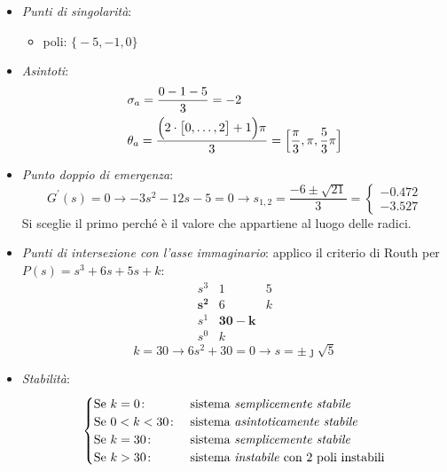 \begin{esercizio}
\begin{itemize}
	\item \emph{Punti di singolarità}:
		\begin{itemize}
			\item poli: \(\bigl\{ -5, -1, 0 \bigr\}\)
		\end{itemize}
	\item \emph{Asintoti}:
		\begin{align*}
			& \sigma_a = \frac{0-1-5}{3} = -2 \\
			& \theta_a = \frac{\Bigl( 2 \cdot \bigl[ 0, \dots, 2 \bigr] +1 \Bigr) \pi}{3} = \Bigl[ \frac{\pi}{3}, \pi, \frac{5}{3}\pi \Bigr]
		\end{align*}
	\item \emph{Punto doppio di emergenza}:
		\[
			G^\prime (s) = 0 \rightarrow -3s^2 -12s -5=0 \rightarrow s_{1,2} = \frac{-6\pm\sqrt{21}}{3} = \begin{cases} \bm{-0.472} \\ -3.527 \end{cases}
		\]
		Si sceglie il primo perché è il valore che appartiene al luogo delle radici.
	\item \emph{Punti di intersezione con l'asse immaginario}:
		applico il criterio di Routh per \(P(s) = s^3 +6s +5s +k\):
		\[\begin{array}{r|rr}
			s^3      & 1 & 5 \\
			\bm{s^2} & 6 & k \\
			s^1      & \bm{30-k} \\
			s^0      & k
		\end{array}\]
		\[
			k = 30 \rightarrow 6s^2+30 = 0 \rightarrow s = \pm \jmath \sqrt{5}
		\]
	\item \emph{Stabilità}:
		\[\begin{cases}
			\text{Se } k = 0\colon & \text{sistema \emph{semplicemente stabile}} \\
			\text{Se } 0 < k < 30\colon & \text{sistema \emph{asintoticamente stabile}} \\
			\text{Se } k = 30\colon & \text{sistema \emph{semplicemente stabile}} \\
			\text{Se } k > 30\colon & \text{sistema \emph{instabile} con 2 poli instabili}
		\end{cases}\]
\end{itemize}
\end{esercizio}

